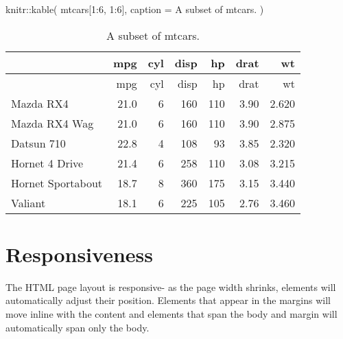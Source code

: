 \documentclass[
  letterpaper,
  DIV=11,
  numbers=noendperiod,
  oneside]{scrartcl}
\newenvironment{Shaded}{\begin{snugshade}}{\end{snugshade}}
\newcommand{\AttributeTok}[1]{\textcolor[rgb]{0.40,0.45,0.13}{#1}}
\newcommand{\DecValTok}[1]{\textcolor[rgb]{0.68,0.00,0.00}{#1}}
\newcommand{\FunctionTok}[1]{\textcolor[rgb]{0.28,0.35,0.67}{#1}}
\newcommand{\NormalTok}[1]{\textcolor[rgb]{0.00,0.23,0.31}{#1}}
\newcommand{\SpecialCharTok}[1]{\textcolor[rgb]{0.37,0.37,0.37}{#1}}
\newcommand{\StringTok}[1]{\textcolor[rgb]{0.13,0.47,0.30}{#1}}
\begin{document}
\begin{Shaded}
\begin{Highlighting}[]
\NormalTok{knitr}\SpecialCharTok{::}\FunctionTok{kable}\NormalTok{(}
\NormalTok{  mtcars[}\DecValTok{1}\SpecialCharTok{:}\DecValTok{6}\NormalTok{, }\DecValTok{1}\SpecialCharTok{:}\DecValTok{6}\NormalTok{], }\AttributeTok{caption =} \StringTok{\textquotesingle{}A subset of mtcars.\textquotesingle{}}
\NormalTok{)}
\end{Highlighting}
\end{Shaded}

{
\makeatletter
\def\LT@makecaption#1#2#3{%
  \noalign{\smash{\hbox{\kern\textwidth\rlap{\kern\marginparsep
  \parbox[t]{\marginparwidth}{%
    \footnotesize{%
      \vspace{(1.1\baselineskip)}
    #1{#2: }\ignorespaces #3}}}}}}%
    }
\makeatother

\begin{longtable}[]{@{}lrrrrrr@{}}
\caption{A subset of mtcars.}\tabularnewline
\toprule\noalign{}
& mpg & cyl & disp & hp & drat & wt \\
\midrule\noalign{}
\endfirsthead
\toprule\noalign{}
& mpg & cyl & disp & hp & drat & wt \\
\midrule\noalign{}
\endhead
\bottomrule\noalign{}
\endlastfoot
Mazda RX4 & 21.0 & 6 & 160 & 110 & 3.90 & 2.620 \\
Mazda RX4 Wag & 21.0 & 6 & 160 & 110 & 3.90 & 2.875 \\
Datsun 710 & 22.8 & 4 & 108 & 93 & 3.85 & 2.320 \\
Hornet 4 Drive & 21.4 & 6 & 258 & 110 & 3.08 & 3.215 \\
Hornet Sportabout & 18.7 & 8 & 360 & 175 & 3.15 & 3.440 \\
Valiant & 18.1 & 6 & 225 & 105 & 2.76 & 3.460 \\
\end{longtable}

}

\hypertarget{responsiveness}{%
\section{Responsiveness}\label{responsiveness}}

The HTML page layout is responsive- as the page width shrinks, elements
will automatically adjust their position. Elements that appear in the
margins will move inline with the content and elements that span the
body and margin will automatically span only the body.
\end{document}
